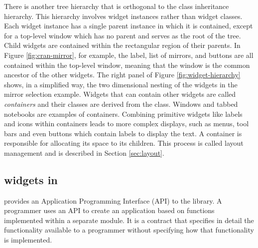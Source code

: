 \documentclass[article,shortnames]{jss}
\begin{document}
There is another tree hierarchy that is orthogonal to the class
inheritance hierarchy. This hierarchy involves widget instances rather
than widget classes. Each widget instance has a single parent instance
in which it is contained, except for a top-level window which has no
parent
and serves as the root of the tree. Child widgets are contained within
the rectangular region of their parents.
In Figure \ref{fig:cran-mirror}, for
example, the label, list of mirrors, and buttons are all contained
within the top-level window, meaning that the window is the common
ancestor of the other widgets.  The right panel of Figure
\ref{fig:widget-hierarchy} shows, in a simplified way, the two
dimensional nesting of the widgets in the mirror selection
example. Widgets that can contain other widgets are called
\emph{containers} and their classes are derived from the
 class. Windows and tabbed notebooks are examples
of containers.  Combining primitive widgets like labels and icons
within containers leads to more complex displays, such as menus,
tool bars and even buttons which contain labels to display the text. A
container is responsible for allocating its space to its
children. This process is called layout management and is described in
Section \ref{sec:layout}.

\subsection[GTK+ widgets in R]{ widgets in }
 provides an Application Programming Interface (API) to the
library. A programmer uses an API to create an application based on
functions implemented
within a separate module. It is a contract that specifies in detail
the functionality available to a programmer without specifying how
that functionality is implemented. 
 
\end{document}
